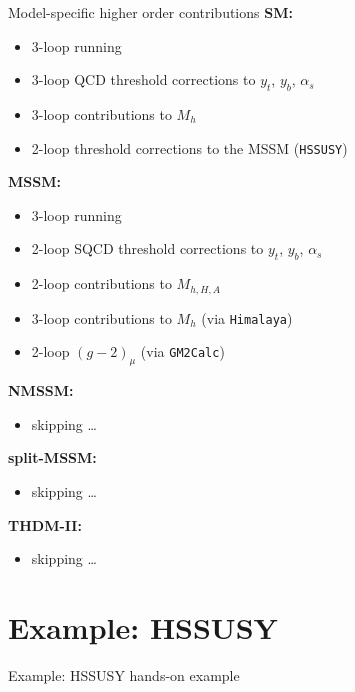 \documentclass[hyperref={pdfpagelabels=false},ngerman]{beamer}
\renewcommand{\emph}{\textbf}
\newcommand{\Himalaya}{\texttt{Himalaya}}
\newcommand{\GMTCalc}{\texttt{GM2Calc}}
\begin{document}
\begin{frame}{Model-specific higher order contributions}
  \emph{SM:}
  \begin{itemize}
  \item 3-loop running
  \item 3-loop QCD threshold corrections to $y_t$, $y_b$, $\alpha_s$
  \item 3-loop contributions to $M_h$
  \item 2-loop threshold corrections to the MSSM (\texttt{HSSUSY})
  \end{itemize}
  \emph{MSSM:}
  \begin{itemize}
  \item 3-loop running
  \item 2-loop SQCD threshold corrections to $y_t$, $y_b$, $\alpha_s$
  \item 2-loop contributions to $M_{h,H,A}$
  \item 3-loop contributions to $M_h$ (via \Himalaya)
  \item 2-loop $(g-2)_\mu$ (via \GMTCalc)
  \end{itemize}
  \emph{NMSSM:}
  \begin{itemize}
  \item skipping \ldots
  \end{itemize}
  \emph{split-MSSM:}
  \begin{itemize}
  \item skipping \ldots
  \end{itemize}
  \emph{THDM-II:}
  \begin{itemize}
  \item skipping \ldots
  \end{itemize}
\end{frame}

\section{Example: HSSUSY}

\begin{frame}{Example: HSSUSY}
  hands-on example
\end{frame}
\end{document}
